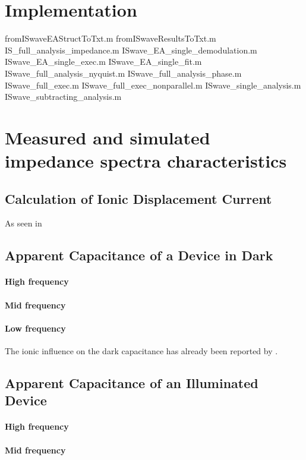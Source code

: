 \section{Implementation}

	fromISwaveEAStructToTxt.m
fromISwaveResultsToTxt.m
IS_full_analysis_impedance.m
ISwave_EA_single_demodulation.m
ISwave_EA_single_exec.m
ISwave_EA_single_fit.m
ISwave_full_analysis_nyquist.m
ISwave_full_analysis_phase.m
ISwave_full_exec.m
ISwave_full_exec_nonparallel.m
ISwave_single_analysis.m
ISwave_subtracting_analysis.m


\section{Measured and simulated impedance spectra characteristics}

	\subsection{Calculation of Ionic Displacement Current}\label{displacement_current_ionic}
		As seen in 

\subsection{Apparent Capacitance of a Device in Dark}
\paragraph{High frequency}
\paragraph{Mid frequency}
\paragraph{Low frequency}
The ionic influence on the dark capacitance has already been reported by .

\subsection{Apparent Capacitance of an Illuminated Device}
\paragraph{High frequency}
\paragraph{Mid frequency}
